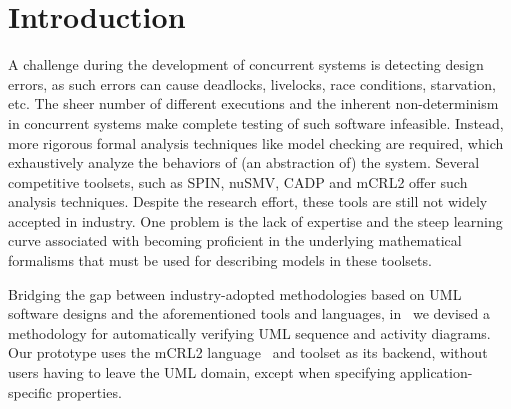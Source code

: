 \documentclass[letter]{llncs}
\begin{document}
\section{Introduction}
\vspace{-10 pt}

\label{sec:Introduction}
A challenge during the development of concurrent systems is detecting
design errors, as such errors can cause deadlocks, livelocks, race conditions,
starvation, etc. The sheer number of different executions and the
inherent non-determinism in concurrent systems make complete testing of such software
infeasible. Instead, more rigorous formal analysis techniques like
model checking are required, which exhaustively analyze the behaviors of 
(an abstraction of) the system. Several competitive 
toolsets, such as SPIN, nuSMV, CADP and mCRL2 offer such analysis techniques.
Despite the research effort, these tools are still not widely accepted
in industry. One problem is the lack of expertise and the steep learning
curve associated with becoming proficient in the underlying mathematical
formalisms that must be used for describing models in these toolsets.

Bridging the gap between industry-adopted methodologies based on
UML software designs and the aforementioned tools and languages,
in~\cite{DBLP:dblp_conf/nfm/RemenskaTWHVCB13} we devised a
methodology for automatically verifying UML 
sequence and activity diagrams.  Our prototype uses the mCRL2
language~\cite{FormalLanguagemCRL2} and toolset as its backend,
without users having to leave the UML domain, except when specifying
application-specific properties.


\end{document}
